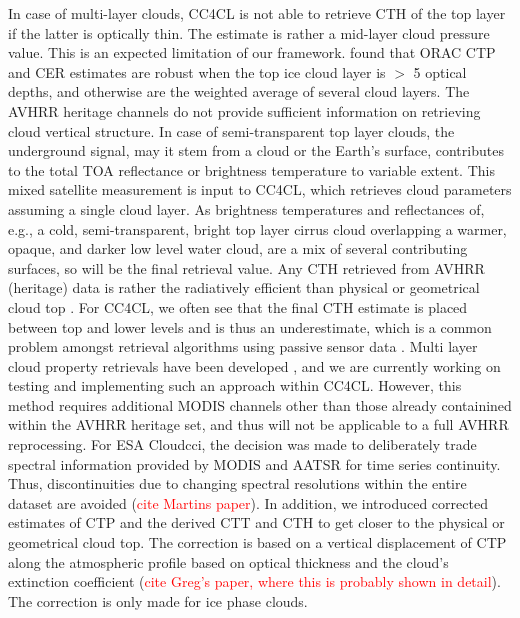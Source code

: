 In case of multi-layer clouds, CC4CL is not able to retrieve CTH of the top layer if the latter is optically thin. The estimate is rather a mid-layer cloud pressure value. This is an expected limitation of our framework. \citet{Poulsen12} found that ORAC CTP and CER estimates are robust when the top ice cloud layer is $>$ 5 optical depths, and otherwise are the weighted average of several cloud layers. The AVHRR heritage channels do not provide sufficient information on retrieving cloud vertical structure. In case of semi-transparent top layer clouds, the underground signal, may it stem from a cloud or the Earth's surface, contributes to the total TOA reflectance or brightness temperature to variable extent. This mixed satellite measurement is input to CC4CL, which retrieves cloud parameters assuming a single cloud layer. As brightness temperatures and reflectances of, e.g., a cold, semi-transparent, bright top layer cirrus cloud overlapping a warmer, opaque, and darker low level water cloud, are a mix of several contributing surfaces, so will be the final retrieval value. Any CTH retrieved from AVHRR (heritage) data is rather the radiatively efficient than physical or geometrical cloud top \citep{Karlsson13}. For CC4CL, we often see that the final CTH estimate is placed between top and lower levels and is thus an underestimate, which is a common problem amongst retrieval algorithms using passive sensor data \citep{Watts11,Holz08,Karlsson13}. Multi layer cloud property retrievals have been developed \citep{Watts11}, and we are currently working on testing and implementing such an approach within CC4CL. However, this method requires additional MODIS channels other than those already containined within the AVHRR heritage set, and thus will not be applicable to a full AVHRR reprocessing. For ESA Cloud\textunderscore cci, the decision was made to deliberately trade spectral information provided by MODIS and AATSR for time series continuity. Thus, discontinuities due to changing spectral resolutions within the entire dataset are avoided (\textcolor{red}{cite Martins paper}). In addition, we introduced corrected estimates of CTP and the derived CTT and CTH to get closer to the physical or geometrical cloud top. The correction is based on a vertical displacement of CTP along the atmospheric profile based on optical thickness and the cloud's extinction coefficient (\textcolor{red}{cite Greg's paper, where this is probably shown in detail}). The correction is only made for ice phase clouds.

